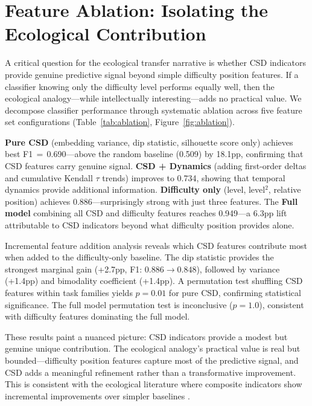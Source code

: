 \documentclass[11pt,letterpaper]{article}
\begin{document}
\section{Feature Ablation: Isolating the Ecological Contribution}
\label{sec:ablation}

A critical question for the ecological transfer narrative is whether CSD indicators provide genuine predictive signal beyond simple difficulty position features. If a classifier knowing only the difficulty level performs equally well, then the ecological analogy---while intellectually interesting---adds no practical value. We decompose classifier performance through systematic ablation across five feature set configurations (Table~\ref{tab:ablation}, Figure~\ref{fig:ablation}).

\textbf{Pure CSD} (embedding variance, dip statistic, silhouette score only) achieves best F1$\,{=}\,$0.690---above the random baseline (0.509) by 18.1pp, confirming that CSD features carry genuine signal. \textbf{CSD + Dynamics} (adding first-order deltas and cumulative Kendall $\tau$ trends) improves to 0.734, showing that temporal dynamics provide additional information. \textbf{Difficulty only} (level, level$^2$, relative position) achieves 0.886---surprisingly strong with just three features. The \textbf{Full model} combining all CSD and difficulty features reaches 0.949---a 6.3pp lift attributable to CSD indicators beyond what difficulty position provides alone.

Incremental feature addition analysis reveals which CSD features contribute most when added to the difficulty-only baseline. The dip statistic provides the strongest marginal gain (+2.7pp, F1: $0.886 \to 0.848$), followed by variance (+1.4pp) and bimodality coefficient (+1.4pp). A permutation test shuffling CSD features within task families yields $p{=}0.01$ for pure CSD, confirming statistical significance. The full model permutation test is inconclusive ($p{=}1.0$), consistent with difficulty features dominating the full model.

These results paint a nuanced picture: CSD indicators provide a modest but genuine unique contribution. The ecological analogy's practical value is real but bounded---difficulty position features capture most of the predictive signal, and CSD adds a meaningful refinement rather than a transformative improvement. This is consistent with the ecological literature where composite indicators show incremental improvements over simpler baselines \cite{dakos2012methods}.
\end{document}
